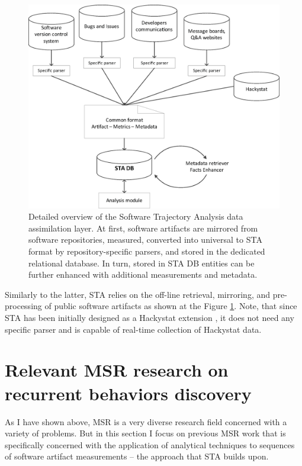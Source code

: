 \begin{figure}[t]
   \centering
   \includegraphics[width=115mm]{figures/Flow.eps}
   \caption{Detailed overview of the Software Trajectory Analysis data assimilation layer. 
    At first, software artifacts are mirrored from software repositories, measured, converted into 
    universal to STA format by repository-specific parsers, and stored in the dedicated relational database.
    In turn, stored in STA DB entities can be further enhanced with additional measurements and metadata.}
   \label{fig:sta-assimilation}
\end{figure}

Similarly to the latter, STA relies on the off-line retrieval, mirroring, and pre-processing of public software artifacts as
shown at the Figure \ref{fig:sta-assimilation}. Note, that since STA has been initially designed as a Hackystat extension 
\cite{csdl2-10-09}, it does not need any specific parser and is capable of real-time collection of Hackystat data.

\section{Relevant MSR research on recurrent behaviors discovery}
As I have shown above, MSR is a very diverse research field concerned with a variety of problems. 
But in this section I focus on previous MSR work that is specifically concerned with the application of analytical 
techniques to sequences of software artifact measurements -- the approach that STA builds upon.

